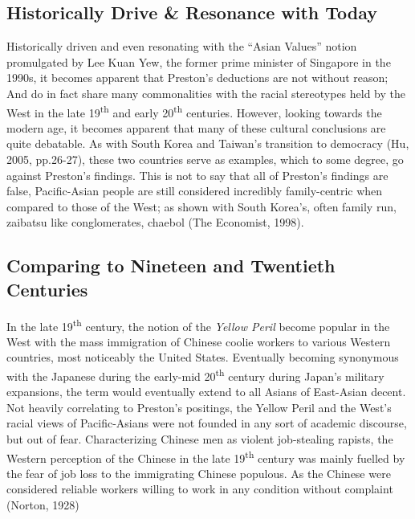 \documentclass[man,donotrepeattitle,letter]{apa6}
\begin{document}
\subsection{Historically Drive \& Resonance with Today}
Historically driven and even resonating with the ``Asian Values'' notion promulgated by Lee Kuan Yew, the former prime minister of Singapore in the 1990s, it becomes apparent that Preston's deductions are not without reason; And do in fact share many commonalities with the racial stereotypes held by the West in the late 19\textsuperscript{th} and early 20\textsuperscript{th} centuries.  However, looking towards the modern age, it becomes apparent that many of these cultural conclusions are quite debatable. As with South Korea and Taiwan's transition to democracy (Hu, 2005, pp.26-27), these two countries serve as examples, which to some degree, go against Preston's findings.  This is not to say that all of Preston's findings are false, Pacific-Asian people are still considered incredibly family-centric when compared to those of the West; as shown with South Korea's, often family run, zaibatsu like conglomerates, chaebol (The Economist, 1998).

\subsection{Comparing to Nineteen and Twentieth Centuries}
In the late 19\textsuperscript{th}  century, the notion of the \textit{Yellow Peril} become popular in the West with the mass immigration of Chinese coolie workers to various Western countries, most noticeably the United States.  Eventually becoming synonymous with the Japanese during the early-mid 20\textsuperscript{th}  century during Japan's military expansions, the term would eventually extend to all Asians of East-Asian decent.  Not heavily correlating to Preston's positings, the Yellow Peril and the West's racial views of Pacific-Asians were not founded in any sort of academic discourse, but out of fear. Characterizing Chinese men as violent job-stealing rapists, the Western perception of the Chinese in the late 19\textsuperscript{th}  century was mainly fuelled by the fear of job loss to the immigrating Chinese populous. As the Chinese were considered reliable workers willing to work in any condition without complaint (Norton, 1928)
\end{document}
